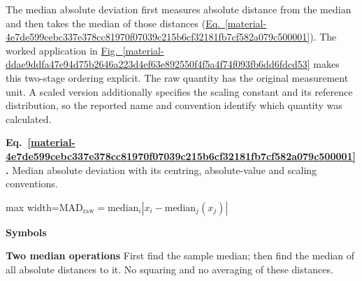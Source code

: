 \documentclass[11pt,a4paper]{article}
\begin{document}
\medskip

The median absolute deviation first measures absolute distance from the median and then takes the median of those distances (\hyperref[material-4e7de599cebc337e378cc81970f07039c215b6cf32181fb7cf582a079c500001]{Eq.~\ref*{material-4e7de599cebc337e378cc81970f07039c215b6cf32181fb7cf582a079c500001}}). The worked application in \hyperref[material-ddae9ddfa47e94d75b2646a223d4ef63e892550f4f5a4f74f093fb6dd6fdcd53]{Fig.~\ref*{material-ddae9ddfa47e94d75b2646a223d4ef63e892550f4f5a4f74f093fb6dd6fdcd53}} makes this two-stage ordering explicit. The raw quantity has the original measurement unit. A scaled version additionally specifies the scaling constant and its reference distribution, so the reported name and convention identify which quantity was calculated.


\par\medskip
\begin{samepage}
\label{material-4e7de599cebc337e378cc81970f07039c215b6cf32181fb7cf582a079c500001}
\noindent\textbf{Eq.~\ref*{material-4e7de599cebc337e378cc81970f07039c215b6cf32181fb7cf582a079c500001}.} Median absolute deviation with its centring, absolute-value and scaling conventions.\par\nopagebreak
\begin{center}\begin{adjustbox}{max width=\linewidth}$\displaystyle \mathrm{MAD}_{\mathrm{raw}}=\mathrm{median}_i\left|x_i-\mathrm{median}_j(x_j)\right|$\end{adjustbox}\end{center}

\par\noindent\textbf{Symbols}

\par\noindent\textbf{Two median operations} First find the sample median; then find the median of all absolute distances to it. No squaring and no averaging of these distances.

\end{samepage}
\medskip
\end{document}
